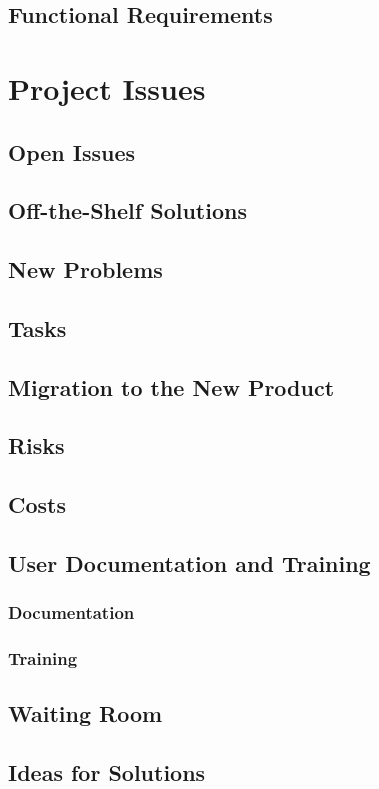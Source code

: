 \documentclass{article}
\begin{document}
\subsection{Functional Requirements}



\section{Project Issues}
\subsection{Open Issues}
\subsection{Off-the-Shelf Solutions}
\subsection{New Problems}
\subsection{Tasks}
\subsection{Migration to the New Product}
\subsection{Risks}
\subsection{Costs}
\subsection{User Documentation and Training}
\subsubsection{Documentation}
\subsubsection{Training}
\subsection{Waiting Room}
\subsection{Ideas for Solutions}
\end{document}
